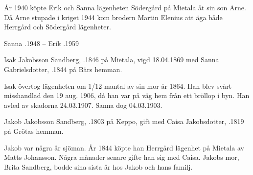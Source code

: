 År 1940 köpte Erik och Sanna lägenheten Södergård på Mietala åt sin son Arne. Då Arne stupade i kriget 1944 kom brodern Martin Elenius att äga både Herrgård och Södergård lägenheter.

Sanna .1948  --  Erik .1959


Isak Jakobsson Sandberg, .1846 på Mietala, vigd 18.04.1869 med Sanna Gabrielsdotter, .1844 på Bärs hemman.
\begin{jhchildren}
  \item {}
  \item {}
  \item {}
  \item {}
  \item {}
  \item {}
  \item {}
\end{jhchildren}

Isak övertog lägenheten om 1/12 mantal av sin mor år 1864. Han blev svårt misshandlad den 19 aug. 1906, då han var på väg hem från ett bröllop i byn. Han avled av skadorna 24.03.1907. Sanna dog 04.03.1903.


Jakob Jakobsson Sandberg, .1803 på Keppo, gift med Caisa Jakobsdotter, .1819 på Grötas hemman.
\begin{jhchildren}
  \item {}
  \item {}
  \item {}
  \item {}
  \item {}
  \item {}
\end{jhchildren}

Jakob var några år sjöman. År 1844 köpte han Herrgård lägenhet på Mietala av Matts Johansson. Några månader senare gifte han sig med Caisa. Jakobs mor, Brita Sandberg, bodde sina sista år hos Jakob och hans familj.

